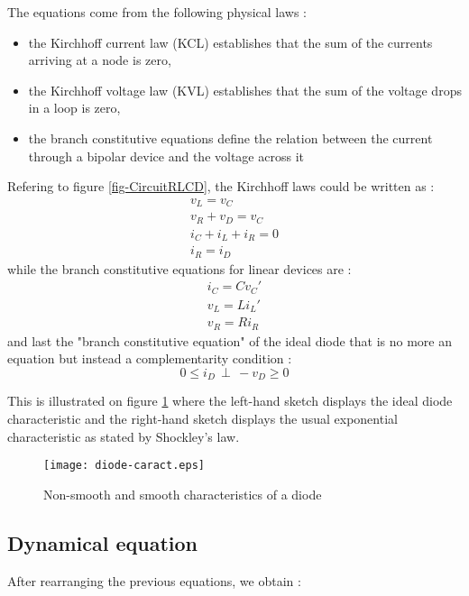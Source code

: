 \documentclass[10pt]{article}
\begin{document}
The equations come from the following physical laws :
\begin{itemize}
\item the Kirchhoff current law (KCL) establishes that the sum of the currents arriving at a node is zero,
\item the Kirchhoff voltage law (KVL) establishes that the sum of the voltage drops in a loop is zero,
\item the branch constitutive equations define the relation between the current through a bipolar device
and the voltage across it
\end{itemize}
Refering to figure \ref{fig-CircuitRLCD}, the Kirchhoff laws could be written as :
\[
\begin{array}{l}
v_L = v_C\\
v_R + v_D = v_C\\
i_C + i_L + i_R = 0\\
i_R = i_D
\end{array}
\]
while the branch constitutive equations for linear devices are :
\[
\begin{array}{l}
i_C = C v_C'\\
v_L = L i_L'\\
v_R = R i_R
\end{array}
\]
and last the "branch constitutive equation" of the ideal diode that is no more an equation but instead
a complementarity condition :
\[ 
0 \leq i_D \, \perp \, -v_D \geq 0
\]

This is illustrated on figure \ref{fig-diode-reg} where the left-hand sketch displays the ideal diode 
characteristic and the right-hand sketch displays the usual exponential characteristic as stated by
Shockley's law.

\begin{figure}[htp]
\begin{center}
\texttt{[image: diode-caract.eps]}
\end{center}
\caption{Non-smooth and smooth characteristics of a diode}
\label{fig-diode-reg}
\end{figure}


\subsection{Dynamical equation}
\label{sec-dyn-eq}
After rearranging the previous equations, we obtain :
\end{document}
